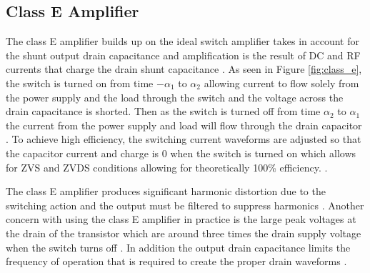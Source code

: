 \subsection{Class E Amplifier}

The class E amplifier builds up on the ideal switch amplifier takes in account for the shunt output drain capacitance and amplification is the result of DC and RF currents that charge the drain shunt capacitance \cite{Raab2003}. As seen in Figure \ref{fig:class_e}, the switch is turned on from  time $-\alpha_1$ to $\alpha_2$ allowing current to flow solely from the power supply and the load through the switch and the voltage across the drain capacitance is shorted. Then as the switch is turned off from time $\alpha_2$ to $\alpha_1$ the current from the power supply and load will flow through the drain capacitor \cite{C.Cripps2006}. To achieve high efficiency, the switching current waveforms are adjusted so that the capacitor current and charge is 0 when the switch is turned on which allows for ZVS and ZVDS conditions allowing for theoretically 100\% efficiency. \cite{Kee2003}.

The class E amplifier produces significant harmonic distortion due to the switching action and the output must be filtered to suppress harmonics \cite{Sokal1975}. Another concern with using the class E amplifier in practice is the large peak voltages at the drain of the transistor which are around three times the drain supply voltage when the switch turns off \cite{Hella}. In addition the output drain capacitance limits the frequency of operation that is required to create the proper drain waveforms \cite{Rosu2001}.

